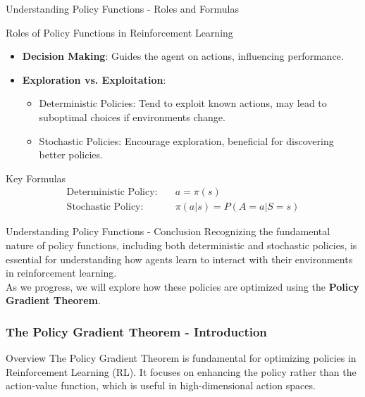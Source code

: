 \documentclass[aspectratio=169]{beamer}
\begin{document}
\begin{frame}[fragile]{Understanding Policy Functions - Roles and Formulas}
    \begin{block}{Roles of Policy Functions in Reinforcement Learning}
        \begin{itemize}
            \item \textbf{Decision Making}: Guides the agent on actions, influencing performance.
            \item \textbf{Exploration vs. Exploitation}:
                \begin{itemize}
                    \item Deterministic Policies: Tend to exploit known actions, may lead to suboptimal choices if environments change.
                    \item Stochastic Policies: Encourage exploration, beneficial for discovering better policies.
                \end{itemize}
        \end{itemize}
    \end{block}
    
    \begin{block}{Key Formulas}
        \begin{align*}
        \text{Deterministic Policy:} \quad & a = \pi(s) \\
        \text{Stochastic Policy:} \quad & \pi(a|s) = P(A = a | S = s)
        \end{align*}
    \end{block}
\end{frame}

\begin{frame}[fragile]{Understanding Policy Functions - Conclusion}
    Recognizing the fundamental nature of policy functions, including both deterministic and stochastic policies, is essential for understanding how agents learn to interact with their environments in reinforcement learning. 
    \\[0.5cm]
    As we progress, we will explore how these policies are optimized using the \textbf{Policy Gradient Theorem}.
\end{frame}

\begin{frame}[fragile]
    \frametitle{The Policy Gradient Theorem - Introduction}
    \begin{block}{Overview}
        The Policy Gradient Theorem is fundamental for optimizing policies in Reinforcement Learning (RL). 
        It focuses on enhancing the policy rather than the action-value function, which is useful in high-dimensional action spaces.
    \end{block}
\end{frame}
\end{document}
